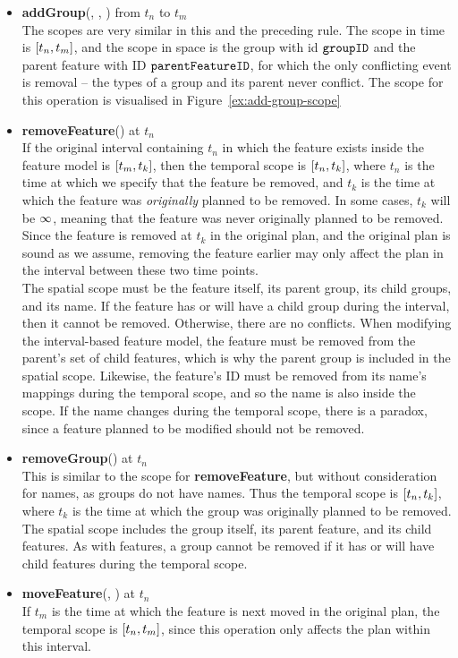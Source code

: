 \begin{itemize}
  \item \textbf{addGroup}(, , ) from $t_n$ to $t_m$\\
    The scopes are very similar in this and the preceding rule. The scope in time is $\interval{t_n}{t_m}$, and the scope in space is the group with id $\texttt{groupID}$ and the parent feature with ID $\texttt{parentFeatureID}$, for which the only conflicting event is removal -- the types of a group and its parent never conflict. The scope for this operation is visualised in Figure~\vref{ex:add-group-scope}
  \item \textbf{removeFeature}() at $t_n$\\
    If the original interval containing $t_n$ in which the feature exists inside the feature model is $\interval{t_m}{t_k}$, then the temporal scope is $\interval{t_n}{t_k}$, where $t_n$ is the time at which we specify that the feature be removed, and $t_k$ is the time at which the feature was \emph{originally} planned to be removed. In some cases, $t_k$ will be $\infty$, meaning that the feature was never originally planned to be removed. Since the feature is removed at $t_k$ in the original plan, and the original plan is sound as we assume, removing the feature earlier may only affect the plan in the interval between these two time points.\\
    The spatial scope must be the feature itself, its parent group, its child groups, and its name. If the feature has or will have a child group during the interval, then it cannot be removed. Otherwise, there are no conflicts. When modifying the interval-based feature model, the feature must be removed from the parent's set of child features, which is why the parent group is included in the spatial scope. Likewise, the feature's ID must be removed from its name's mappings during the temporal scope, and so the name is also inside the scope. If the name changes during the temporal scope, there is a paradox, since a feature planned to be modified should not be removed.  
  \item \textbf{removeGroup}() at $t_n$\\
    This is similar to the scope for \textbf{removeFeature}, but without consideration for names, as groups do not have names.  Thus the temporal scope is $\interval{t_n}{t_k}$, where $t_k$ is the time at which the group was originally planned to be removed. The spatial scope includes the group itself, its parent feature, and its child features. As with features, a group cannot be removed if it has or will have child features during the temporal scope.
  \item \textbf{moveFeature}(, ) at $t_n$ \\
  If $t_m$ is the time at which the feature is next moved in the original plan, the temporal scope is $\interval{t_n}{t_m}$, since this operation only affects the plan within this interval.
  \begin{figure}[h]
    \centering


\end{figure}
\end{itemize}
